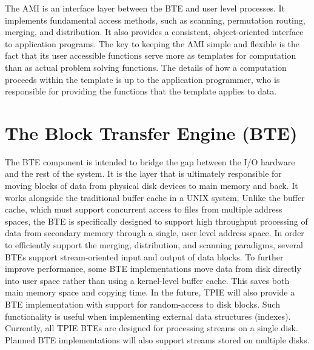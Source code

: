 
The AMI is an interface layer between the BTE and user
level processes.  It implements fundamental access methods, such as
scanning, permutation routing, merging, and distribution. It also provides
a consistent, object-oriented interface to application programs.
The key to keeping the AMI simple and flexible is the fact that its
user accessible functions serve more as templates for computation than
as actual problem solving functions.  The details of how a computation
proceeds within the template is up to the application programmer, who
is responsible for providing the functions that the template applies
to data.

\section{The Block Transfer Engine (BTE)}


The BTE component is intended to bridge the gap between the
I/O hardware and the rest of the system. It is the layer
that is ultimately responsible for moving blocks of data
from physical disk devices to main memory and back. It works
alongside the traditional buffer cache
in a UNIX system.  Unlike the buffer cache, which must
support concurrent access to files from multiple address
spaces, the BTE is specifically designed to support high
throughput processing of data from secondary memory through
a single, user level address space.  In order to efficiently
support the merging, distribution, and scanning paradigms,
several BTEs support stream-oriented input and output of
data blocks.  To further improve performance, some BTE
implementations move data from disk directly into user space
rather than using a kernel-level buffer cache.  This saves both main memory space and copying
time. In the future, TPIE will also provide a BTE
implementation with support for random-access to disk
blocks. Such functionality is useful when implementing
external data structures (indexes).  Currently, all TPIE
BTEs are designed for processing streams on a single disk.
Planned BTE implementations will also support streams stored
on multiple disks.

